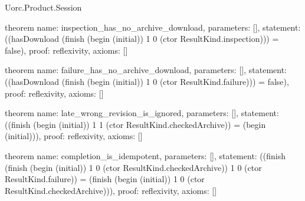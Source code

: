 \begin{lexlean}{Uorc.Product.Session}
\begin{semanticmodule}
theorem{
  name: inspection_has_no_archive_download,
  parameters: [],
  statement: ((hasDownload (finish (begin (initial)) 1 0 (ctor ResultKind.inspection))) = false),
  proof: reflexivity{},
  axioms: []
}

theorem{
  name: failure_has_no_archive_download,
  parameters: [],
  statement: ((hasDownload (finish (begin (initial)) 1 0 (ctor ResultKind.failure))) = false),
  proof: reflexivity{},
  axioms: []
}

theorem{
  name: late_wrong_revision_is_ignored,
  parameters: [],
  statement: ((finish (begin (initial)) 1 1 (ctor ResultKind.checkedArchive)) = (begin (initial))),
  proof: reflexivity{},
  axioms: []
}

theorem{
  name: completion_is_idempotent,
  parameters: [],
  statement: ((finish (finish (begin (initial)) 1 0 (ctor ResultKind.checkedArchive)) 1 0 (ctor ResultKind.failure)) = (finish (begin (initial)) 1 0 (ctor ResultKind.checkedArchive))),
  proof: reflexivity{},
  axioms: []
}
\end{semanticmodule}
\end{lexlean}
